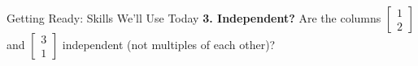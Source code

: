 \documentclass[10pt]{article}
\begin{document}
\begin{notesbox}{Getting Ready: Skills We'll Use Today}
\vspace{6pt}
\textbf{3. Independent?} Are the columns $\begin{bmatrix} 1 \\ 2 \end{bmatrix}$ and
$\begin{bmatrix} 3 \\ 1 \end{bmatrix}$ independent (not multiples of each other)?
\end{notesbox}
\end{document}
